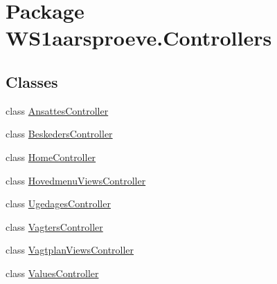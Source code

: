 \hypertarget{namespace_w_s1aarsproeve_1_1_controllers}{}\section{Package W\+S1aarsproeve.\+Controllers}
\label{namespace_w_s1aarsproeve_1_1_controllers}
\subsection*{Classes}
\begin{DoxyCompactItemize}
\item 
class \hyperlink{class_w_s1aarsproeve_1_1_controllers_1_1_ansattes_controller}{Ansattes\+Controller}
\item 
class \hyperlink{class_w_s1aarsproeve_1_1_controllers_1_1_beskeders_controller}{Beskeders\+Controller}
\item 
class \hyperlink{class_w_s1aarsproeve_1_1_controllers_1_1_home_controller}{Home\+Controller}
\item 
class \hyperlink{class_w_s1aarsproeve_1_1_controllers_1_1_hovedmenu_views_controller}{Hovedmenu\+Views\+Controller}
\item 
class \hyperlink{class_w_s1aarsproeve_1_1_controllers_1_1_ugedages_controller}{Ugedages\+Controller}
\item 
class \hyperlink{class_w_s1aarsproeve_1_1_controllers_1_1_vagters_controller}{Vagters\+Controller}
\item 
class \hyperlink{class_w_s1aarsproeve_1_1_controllers_1_1_vagtplan_views_controller}{Vagtplan\+Views\+Controller}
\item 
class \hyperlink{class_w_s1aarsproeve_1_1_controllers_1_1_values_controller}{Values\+Controller}
\end{DoxyCompactItemize}
